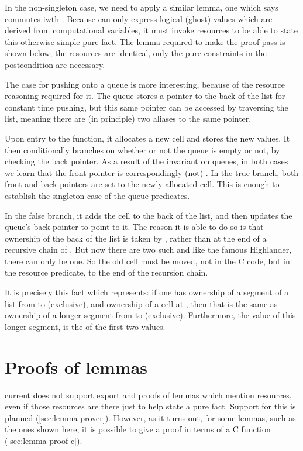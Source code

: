 In the non-singleton case, we need to apply a similar lemma, one which
says  commutes iwth . Because  can
only express logical (ghost) values which are derived from computational
variables, it must invoke resources to be able to state this otherwise
simple pure fact. The lemma required to make the proof pass is shown below;
the resources are identical, only the pure constraints in the postcondition
are necessary.


The case for pushing onto a queue is more interesting, because of the resource
reasoning required for it. The queue stores a pointer to the back of the list
for constant time pushing, but this same pointer can be accessed by traversing
the list, meaning there are (in principle) two aliases to the same pointer.

Upon entry to the function, it allocates a new cell and stores the new values.
It then conditionally branches on whether or not the queue is empty or not, by
checking the back pointer. As a result of the invariant on queues, in both
cases we learn that the front pointer is correspondingly (not) .
In the true branch, both front and back pointers are set to the newly allocated
cell. This is enough to establish the singleton case of the queue predicates.

In the false branch, it adds the cell to the back of the list, and then updates
the queue's back pointer to point to it. The reason it is able to do so is that
ownership of the back of the list is taken by , rather than
at the end of a recursive chain of . But now there are
two such  and like the famous Highlander,
there can only be one. So the old cell must be moved, not in the C code, but
in the resource predicate, to the end of the  recursion
chain.


It is precisely this fact which  represents: if one has
ownership of a segment of a list from   to 
(exclusive), and ownership of a cell at , then that is the same as
ownership of a longer segment from  to 
(exclusive). Furthermore, the value of this longer segment, is the
 of the first two values.


\section{Proofs of lemmas}

 current does not support export and proofs of lemmas which mention
resources, even if those resources are there just to help state a pure fact.
Support for this is planned (\cref{sec:lemma-prover}). However, as it turns
out, for some lemmas, such as the ones shown here, it is possible to give a
proof in terms of a C function (\cref{sec:lemma-proof-c}).

